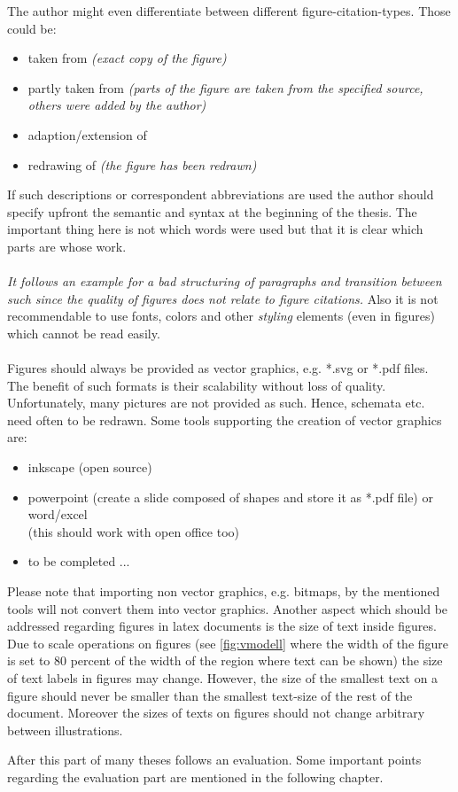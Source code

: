 The author might even differentiate between different figure-citation-types.
Those could be:
\begin{itemize}
	\item taken from \textit{(exact copy of the figure)}
	\item partly taken from \textit{(parts of the figure are taken from the specified source, others were added by the author)}
	\item adaption/extension of
	\item redrawing of \textit{(the figure has been redrawn)}
\end{itemize}
If such descriptions or correspondent abbreviations are used the author should specify upfront the semantic and syntax at the beginning of the thesis.
The important thing here is not which words were used but that it is clear which parts are whose work.
\\\\
\textsl{\textcolor[rgb]{0.75,0.75,0.75}{It follows an example for a bad structuring of paragraphs and transition between such since the quality of figures does not relate to figure citations.}}
Also it is not recommendable to use fonts, \textcolor[rgb]{1,1,0}{colors} and other \textsl{\textit{\colorbox[rgb]{1,1,0.6}{\textcolor[rgb]{0.8,1,0.8}{styling}}}} elements (even in figures) which cannot be read easily.
\\\\
Figures should always be provided as vector graphics, e.g. *.svg or *.pdf files.
The benefit of such formats is their scalability without loss of quality.
Unfortunately, many pictures are not provided as such.
Hence, schemata etc. need often to be redrawn.
Some tools supporting the creation of vector graphics are:
\begin{itemize}
	\item inkscape (open source)
	\item powerpoint (create a slide composed of shapes and store it as *.pdf file) or word/excel\\
	(this should work with open office too)
	\item to be completed ...
\end{itemize}
Please note that importing non vector graphics, e.g. bitmaps, by the mentioned tools will not convert them into vector graphics.
Another aspect which should be addressed regarding figures in latex documents is the size of text inside figures.
Due to scale operations on figures (see \ref{fig:vmodell} where the width of the figure is set to 80 percent of the width of the region where text can be shown) the size of text labels in figures may change.
However, the size of the smallest text on a figure should never be smaller than the smallest text-size of the rest of the document.
Moreover the sizes of texts on figures should not change arbitrary between illustrations.

After this part of many theses follows an evaluation.
Some important points regarding the evaluation part are mentioned in the following chapter.